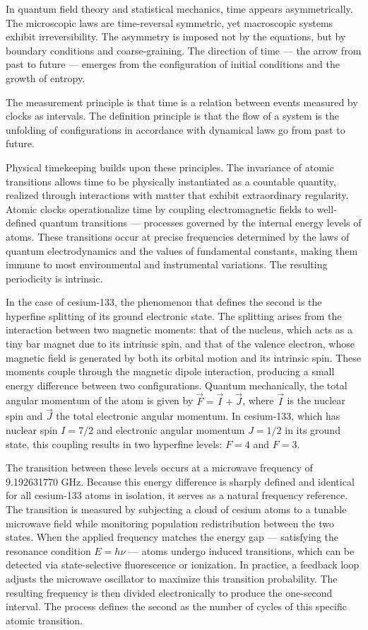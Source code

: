 In quantum field theory and statistical mechanics, time appears asymmetrically. The microscopic laws are time-reversal symmetric, yet macroscopic systems exhibit irreversibility. The asymmetry is imposed not by the equations, but by boundary conditions and coarse-graining. The direction of time — the arrow from past to future — emerges from the configuration of initial conditions and the growth of entropy.

The measurement principle is that time is a relation between events measured by clocks as intervals. The definition principle is that the flow of a system is the unfolding of configurations in accordance with dynamical laws go from past to future. 

Physical timekeeping builds upon these principles. The invariance of atomic transitions allows time to be physically instantiated as a countable quantity, realized through interactions with matter that exhibit extraordinary regularity. Atomic clocks operationalize time by coupling electromagnetic fields to well-defined quantum transitions — processes governed by the internal energy levels of atoms. These transitions occur at precise frequencies determined by the laws of quantum electrodynamics and the values of fundamental constants, making them immune to most environmental and instrumental variations. The resulting periodicity is intrinsic.

In the case of cesium-133, the phenomenon that defines the second is the hyperfine splitting of its ground electronic state. The splitting arises from the interaction between two magnetic moments: that of the nucleus, which acts as a tiny bar magnet due to its intrinsic spin, and that of the valence electron, whose magnetic field is generated by both its orbital motion and its intrinsic spin. These moments couple through the magnetic dipole interaction, producing a small energy difference between two configurations. Quantum mechanically, the total angular momentum of the atom is given by $\vec{F} = \vec{I} + \vec{J}$, where $\vec{I}$ is the nuclear spin and $\vec{J}$ the total electronic angular momentum. In cesium-133, which has nuclear spin $I = 7/2$ and electronic angular momentum $J = 1/2$ in its ground state, this coupling results in two hyperfine levels: $F = 4$ and $F = 3$.

The transition between these levels occurs at a microwave frequency of 9.192631770 GHz. Because this energy difference is sharply defined and identical for all cesium-133 atoms in isolation, it serves as a natural frequency reference. The transition is measured by subjecting a cloud of cesium atoms to a tunable microwave field while monitoring population redistribution between the two states. When the applied frequency matches the energy gap — satisfying the resonance condition $E = h\nu$ — atoms undergo induced transitions, which can be detected via state-selective fluorescence or ionization. In practice, a feedback loop adjusts the microwave oscillator to maximize this transition probability. The resulting frequency is then divided electronically to produce the one-second interval. The process defines the second as the number of cycles of this specific atomic transition. 

